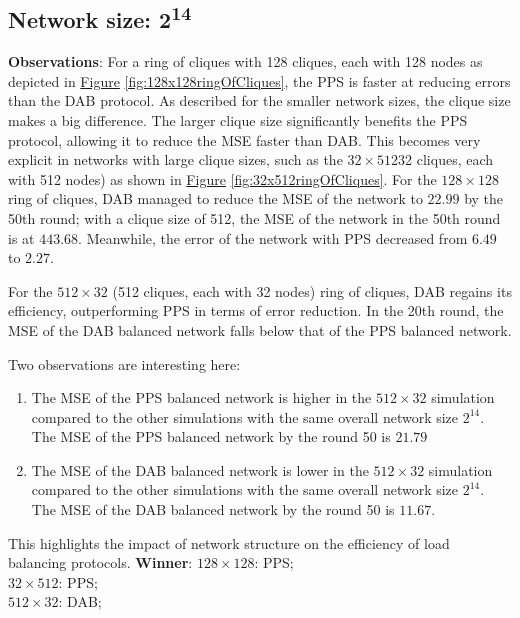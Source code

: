 \subsection{Network size: 2\textsuperscript{14}}
\textbf{Observations}: For a ring of cliques with 128 cliques, each with 128 nodes as depicted in \hyperref[fig:128x128ringOfCliques]{Figure} \ref{fig:128x128ringOfCliques}, the PPS is faster at reducing errors than the DAB protocol. As described for the smaller network sizes, the clique size makes a big difference. The larger clique size significantly benefits the PPS protocol, allowing it to reduce the MSE faster than DAB. This becomes very explicit in networks with large clique sizes, such as the $32 \times 512$32 cliques, each with 512 nodes) as shown in \hyperref[fig:32x512ringOfCliques]{Figure} \ref{fig:32x512ringOfCliques}. For the $128 \times 128$ ring of cliques, DAB managed to reduce the MSE of the network to $22.99$ by the 50th round; with a clique size of 512, the MSE of the network in the 50th round is at $443.68$. Meanwhile, the error of the network with PPS decreased from $6.49$ to $2.27$.

For the $512 \times 32$ (512 cliques, each with 32 nodes) ring of cliques, DAB regains its efficiency, outperforming PPS in terms of error reduction. In the 20th round, the MSE of the DAB balanced network falls below that of the PPS balanced network.

Two observations are interesting here:
\begin{enumerate}
    \item The MSE of the PPS balanced network is higher in the $512 \times 32$ simulation compared to the other simulations with the same overall network size $2^{14}$. The MSE of the PPS balanced network by the round 50 is $21.79$
    \item The MSE of the DAB balanced network is lower in the $512 \times 32$ simulation compared to the other simulations with the same overall network size $2^{14}$. The MSE of the DAB balanced network by the round 50 is $11.67$.\\
\end{enumerate}
This highlights the impact of network structure on the efficiency of load balancing protocols.
\textbf{Winner}: $128\times128$: PPS; \\
$32\times512$: PPS; \\
$512\times32$: DAB;


